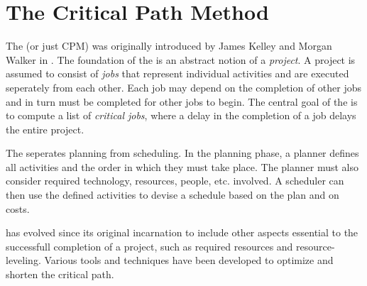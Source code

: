 \section{The Critical Path Method}

The \cpm{} (or just CPM) was originally introduced by James Kelley and Morgan Walker in
\cite{Kelley:1959:CPS:1460299.1460318}. The foundation of the \cpm{} is an abstract notion of a
\emph{project}. A project is assumed to consist of \emph{jobs} that represent individual activities
and are executed seperately from each other. Each job may depend on the completion of other jobs and
in turn must be completed for other jobs to begin. The central goal of the \cpm{} is to compute a list
of \emph{critical jobs}, where a delay in the completion of a job delays the entire project.

The \cpm{} seperates planning from scheduling. In the planning phase, a planner defines all
activities and the order in which they must take place. The planner must also consider required 
technology, resources, people, etc. involved. A scheduler can then use the defined activities to
devise a schedule based on the plan and on costs\cite[p. 161]{Kelley:1959:CPS:1460299.1460318}.

\cpm{} has evolved since its original incarnation to include other aspects essential to the
successfull completion of a project, such as required resources and resource-leveling. Various tools
and techniques have been developed to optimize and shorten the critical path.

